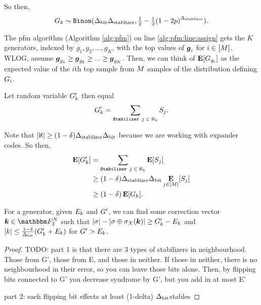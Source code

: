 So then,
$$
	\generatorscoreRV_k \sim \texttt{Binom}(\DegBit \DegStable, \SPr).
$$

The pfm algorithm (Algorithm \ref{alg:pfm}) on line \ref{alg:pfm:line:assign}
gets the $K$ generators, indexed by $g_1, g_2, ..., g_K$, with the top values
of $\boldsymbol{g}_i$ for $i \in [M]$. WLOG, assume
$\boldsymbol{g}_{g_1} \geq \boldsymbol{g}_{g_2} \geq ... \geq \boldsymbol{g}_{g_K}$.
Then, we can think of $\operatorname*{\mathbf{E}}[G_{g_i}]$ as the expected value of the $i$th
top sample from $M$ samples of the distribution defining $G_i$.

Let random variable $G'_k$ then equal
$$
	G'_k =
		\sum_{\texttt{Stabilizer $j$} \; \in \; \aleph_k} S_j.
$$

Note that $|\aleph| \geq (1 - \delta) {\Delta_{\text{stablizer}}} {\Delta_{\text{bit}}}$ because we are working with expander codes.
So then, \begin{align*}
	\operatorname*{\mathbf{E}}[G'_k] &= 
		\sum_{\texttt{Stabilizer $j$} \; \in \; \aleph_k} \operatorname*{\mathbf{E}}[S_j] \\
		&\geq (1 - \delta) {\Delta_{\text{stablizer}}} {\Delta_{\text{bit}}} \operatorname*{\mathbf{E}}_{j \in [M]}[S_j]\\
		&\geq (1 - \delta) \operatorname*{\mathbf{E}}[G_k].
\end{align*}



\begin{lemma}{For a generator, given $E_k$ and $G'$,
\label{lemma:decrby}
	we can find some correction vector $\correctionvec \in \F_2^\NQubits$
	such that \linebreak $|\sigma| - |\sigma \oplus \sigma_X(\boldsymbol{\boldsymbol{k}})| \geq G'_k - E_k$}
	and $|k| \leq \frac{1-\delta}{{\Delta_{\text{bit}}}} (G'_k + E_k)$ for $G' > E_k$.
	\begin{proof}
		TODO:	 part 1 is that there are 3 types of stabilizers in neighbourhood.
		Those from G', those from E, and those in neither. If those in neither, there is no
		neighbourhood in their error, so you can leave those bits alone. Then, by flipping bits
		connected to G' you decrease syndrome by G', but you add in at most E'
		
		part 2: each flipping bit effects at least (1-delta) ${\Delta_{\text{bit}}}$stables
	\end{proof}
\end{lemma}


